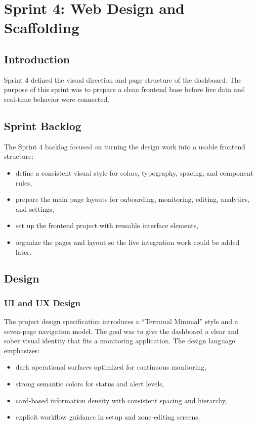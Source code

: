 \chapter{Sprint 4: Web Design and Scaffolding}
\chaptertoc

\clearpage

\section{Introduction}
Sprint 4 defined the visual direction and page structure of the dashboard. The purpose of this sprint was to prepare a clean frontend base before live data and real-time behavior were connected.

\section{Sprint Backlog}
The Sprint 4 backlog focused on turning the design work into a usable frontend structure:
\begin{itemize}
    \item define a consistent visual style for colors, typography, spacing, and component rules,
    \item prepare the main page layouts for onboarding, monitoring, editing, analytics, and settings,
    \item set up the frontend project with reusable interface elements,
    \item organize the pages and layout so the live integration work could be added later.
\end{itemize}

\section{Design}

\subsection{UI and UX Design}
The project design specification introduces a ``Terminal Minimal'' style and a seven-page navigation model. The goal was to give the dashboard a clear and sober visual identity that fits a monitoring application. The design language emphasizes:
\begin{itemize}
    \item dark operational surfaces optimized for continuous monitoring,
    \item strong semantic colors for status and alert levels,
    \item card-based information density with consistent spacing and hierarchy,
    \item explicit workflow guidance in setup and zone-editing screens.
\end{itemize}


